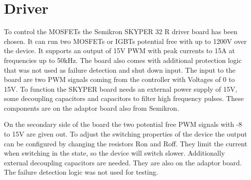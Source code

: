 \section{Driver}\label{sec:driver}

To control the MOSFETs the Semikron SKYPER 32 R driver board has been chosen.
It can run two MOSFETs or IGBTs potential free with up to 1200V over the device.
It supports an output of 15V PWM with peak currents to 15A at frequencies up to 50kHz.
The board also comes with additional protection logic that was not used as failure detection and shut down input.
The input to the board are two PWM signals coming from the controller with Voltages of 0 to 15V.
To function the SKYPER board needs an external power supply of 15V,
some decoupling capacitors and capacitors to filter high frequency pulses.
These components are on the adaptor board also from Semikron.


On the secondary side of the board the two potential free PWM signals with -8 to 15V are given out.
To adjust the switching properties of the device the output can be configured by changing the resistors Ron and Roff.
They limit the current when switching in the state, so the device will switch slower.
Additionally external decoupling capacitors are needed. They are also on the adaptor board.
The failure detection logic was not used for testing.